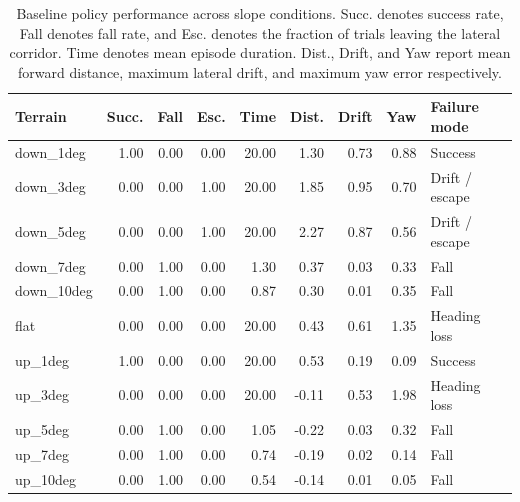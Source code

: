 \begin{table}[h]
\centering
\small
\begin{tabular}{lrrrrrrrl}
\hline
Terrain & Succ. & Fall & Esc. & Time & Dist. & Drift & Yaw & Failure mode \\
\hline
down_1deg & 1.00 & 0.00 & 0.00 & 20.00 & 1.30 & 0.73 & 0.88 & Success \\
down_3deg & 0.00 & 0.00 & 1.00 & 20.00 & 1.85 & 0.95 & 0.70 & Drift / escape \\
down_5deg & 0.00 & 0.00 & 1.00 & 20.00 & 2.27 & 0.87 & 0.56 & Drift / escape \\
down_7deg & 0.00 & 1.00 & 0.00 & 1.30 & 0.37 & 0.03 & 0.33 & Fall \\
down_10deg & 0.00 & 1.00 & 0.00 & 0.87 & 0.30 & 0.01 & 0.35 & Fall \\
flat & 0.00 & 0.00 & 0.00 & 20.00 & 0.43 & 0.61 & 1.35 & Heading loss \\
up_1deg & 1.00 & 0.00 & 0.00 & 20.00 & 0.53 & 0.19 & 0.09 & Success \\
up_3deg & 0.00 & 0.00 & 0.00 & 20.00 & -0.11 & 0.53 & 1.98 & Heading loss \\
up_5deg & 0.00 & 1.00 & 0.00 & 1.05 & -0.22 & 0.03 & 0.32 & Fall \\
up_7deg & 0.00 & 1.00 & 0.00 & 0.74 & -0.19 & 0.02 & 0.14 & Fall \\
up_10deg & 0.00 & 1.00 & 0.00 & 0.54 & -0.14 & 0.01 & 0.05 & Fall \\
\hline
\end{tabular}
\caption{Baseline policy performance across slope conditions. Succ. denotes success rate, Fall denotes fall rate, and Esc. denotes the fraction of trials leaving the lateral corridor. Time denotes mean episode duration. Dist., Drift, and Yaw report mean forward distance, maximum lateral drift, and maximum yaw error respectively.}
\label{tab:baseline_slope_results}
\end{table}
